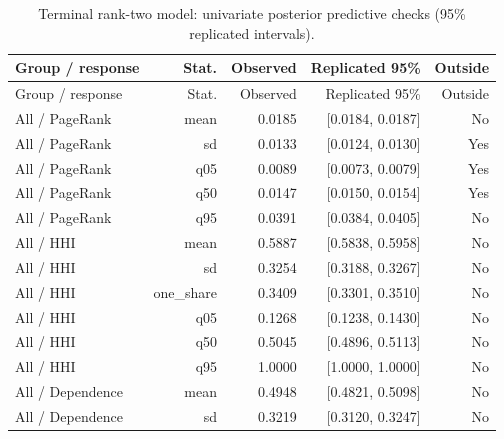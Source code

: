 \documentclass[pdftex,12pt,openright,a4paper,oneside]{book}
\begin{document}
\begin{longtable}{@{}p{}rrrr@{}}

\caption{Terminal rank-two model: univariate posterior predictive checks (95\% replicated intervals).}\label{tab:terminal_rank2_ppc_univariate}\\

\toprule

Group / response & Stat. & Observed & Replicated 95\% & Outside \\

\midrule\endfirsthead

\toprule

Group / response & Stat. & Observed & Replicated 95\% & Outside \\

\midrule\endhead

All / PageRank & mean & 0.0185 & [0.0184, 0.0187] & No \\

All / PageRank & sd & 0.0133 & [0.0124, 0.0130] & Yes \\

All / PageRank & q05 & 0.0089 & [0.0073, 0.0079] & Yes \\

All / PageRank & q50 & 0.0147 & [0.0150, 0.0154] & Yes \\

All / PageRank & q95 & 0.0391 & [0.0384, 0.0405] & No \\

All / HHI & mean & 0.5887 & [0.5838, 0.5958] & No \\

All / HHI & sd & 0.3254 & [0.3188, 0.3267] & No \\

All / HHI & one\_share & 0.3409 & [0.3301, 0.3510] & No \\

All / HHI & q05 & 0.1268 & [0.1238, 0.1430] & No \\

All / HHI & q50 & 0.5045 & [0.4896, 0.5113] & No \\

All / HHI & q95 & 1.0000 & [1.0000, 1.0000] & No \\

All / Dependence & mean & 0.4948 & [0.4821, 0.5098] & No \\

All / Dependence & sd & 0.3219 & [0.3120, 0.3247] & No \\


\end{longtable}
\end{document}
